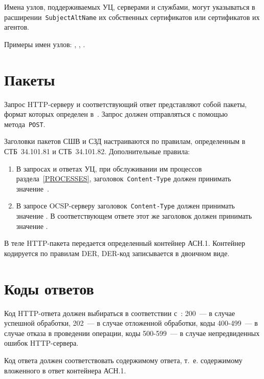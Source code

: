 Имена узлов, поддерживаемых УЦ, серверами и службами, могут указываться в 
расширении~\texttt{SubjectAltName} их собственных сертификатов или 
сертификатов их агентов. 

Примеры имен узлов: , 
, 
.

\section{Пакеты}\label{TRANSPORT.Packets}

Запрос HTTP-серверу и соответствующий ответ представляют собой пакеты,
формат которых определен в~\cite{HTTP}.
%
Запрос должен отправляться с помощью метода~\texttt{POST}.

Заголовки пакетов СШВ и СЗД настраиваются по правилам, 
определенным в СТБ~34.101.81 и СТБ~34.101.82. 
%
Дополнительные правила:
\begin{enumerate}
\item
В запросах и ответах УЦ, при обслуживании им процессов раздела~\ref{PROCESSES},
заголовок~\texttt{Content-Type} должен принимать значение~.

\item
В запросе OCSP-серверу заголовок~\texttt{Content-Type} 
должен принимать значение .
В соответствующем ответе этот же заголовок должен принимать значение 
. 
\end{enumerate}

В теле HTTP-пакета передается определенный контейнер АСН.1.
Контейнер кодируется по правилам DER, DER-код записывается
в двоичном виде.

\section{Коды ответов}\label{TRANSPORT.Codes}

Код HTTP-ответа должен выбираться в соответствии с~\cite{HTTP}: 
200~--- в случае успешной обработки, 
202~--- в случае отложенной обработки,
коды 400-499~--- в случае отказа в проведении операции,
коды 500-599~--- в случае непредвиденных ошибок HTTP-сервера.

Код ответа должен соответствовать содержимому ответа, т.~е.
содержимому вложенного в ответ контейнера АСН.1.

